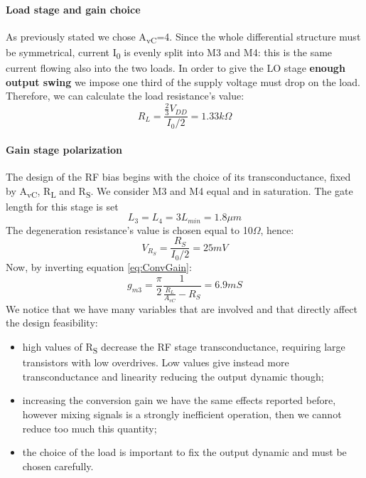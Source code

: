 \paragraph{Load stage and gain choice}
As previously stated we chose A\textsubscript{vC}=4. 
Since the whole differential structure must be symmetrical, current I\textsubscript{0} is evenly split into M3 and M4: this is the same current flowing also into the two loads. In order to give the LO stage \textbf{enough output swing} we impose one third of the supply voltage must drop on the load. Therefore, we can calculate the load resistance's value:
\begin{equation}
R_L = \frac{\frac{2}{3}V_{DD}}{I_0/2} = 1.33 k\Omega
\end{equation}

\paragraph{Gain stage polarization}
The design of the RF bias begins with the choice of its transconductance, fixed by A\textsubscript{vC}, R\textsubscript{L} and R\textsubscript{S}. We consider M3 and M4 equal and in saturation. The gate length for this stage is set
\begin{equation}
	L_3 = L_4 = 3 L_{min} = 1.8 \mu m
\end{equation} 
The  degeneration resistance's value is chosen equal to 10$\Omega$, hence:
\begin{equation}
V_{R_S}=\frac{R_S}{I_0/2} = 25 mV
\end{equation}
Now, by inverting equation \ref{eq:ConvGain}:
\begin{equation}
	g_{m3} = \frac{\pi}{2}\frac{1}{\frac{R_L}{A_{vC}}-R_S}=6.9 mS
\end{equation}
We notice that we have many variables that are involved and that directly affect the design feasibility:
\begin{itemize}
	\item high values of R\textsubscript{S} decrease the RF stage transconductance, requiring large transistors with low overdrives. Low values give instead more transconductance and linearity reducing the output dynamic though;
	\item increasing the conversion gain we have the same effects reported before, however mixing signals is a strongly inefficient operation, then we cannot reduce too much this quantity;
	\item the choice of the load is important to fix the output dynamic and must be chosen carefully.
\end{itemize}
